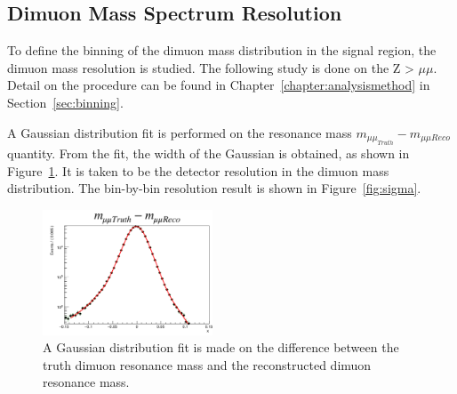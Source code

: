%


\subsection{Dimuon Mass Spectrum Resolution}
To define the binning of the dimuon mass distribution in the signal region, the dimuon mass resolution is studied. The following study is done on the Z > $\mu \mu$. Detail on the procedure can be found in Chapter~\ref{chapter:analysismethod} in Section~\ref{sec:binning}.

A Gaussian distribution fit is performed on the resonance mass $m_{\mu\mu_{Truth}} - m_{\mu\mu{Reco}}$ quantity. From the fit, the width of the Gaussian is obtained, as shown in Figure~\ref{fig:fit}. It is taken to be the detector resolution in the dimuon mass distribution. The bin-by-bin resolution result is shown in Figure~\ref{fig:sigma}.    

\begin{figure}[!htb]
    \begin{center}
        \includegraphics[width=0.45\textwidth]{figures/chapter_dimuon/fitError}        
        \caption{
            A Gaussian distribution fit is made on the difference between the truth dimuon resonance mass and the reconstructed dimuon resonance mass.    }
        \label{fig:fit}
    \end{center}
\end{figure}
\FloatBarrier
   

